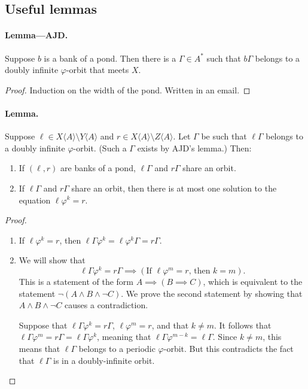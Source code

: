 \documentclass[12pt]{article}
\let\phi\varphi
\def\ofA{\langle A \rangle}
\begin{document}
\subsection{Useful lemmas}
\paragraph{Lemma---AJD.} Suppose $b$ is a bank of a pond. Then there is a $\Gamma \in A^*$ such that $b \Gamma$ belongs to a doubly infinite $\phi$-orbit that meets $X$. 
\begin{proof}Induction on the width of the pond. Written in an email.\end{proof}

\paragraph{Lemma.} Suppose $\ell \in X\ofA \setminus Y\ofA$ and $r \in X\ofA \setminus Z\ofA$. Let $\Gamma$ be such that $\ell\Gamma$ belongs to a doubly infinite $\phi$-orbit. (Such a $\Gamma$ exists by AJD's lemma.) Then:
\begin{enumerate}
	\item \label{it:bank_test_down}
		If $(\ell, r)$ are banks of a pond, $\ell\Gamma$ and $r\Gamma$ share an orbit.
	\item \label{it:bank_test_up} 
		If $\ell\Gamma$ and $r\Gamma$ share an orbit, then there is at most one solution to the equation $\ell\phi^k = r$.
\end{enumerate}
\begin{proof}

\begin{enumerate}
	\item If $\ell\phi^k = r$, then $\ell\Gamma\phi^k = \ell \phi^k \Gamma = r \Gamma$.
	\item We will show that
	\begin{equation*}
		\ell\Gamma\phi^k = r \Gamma \implies (\text{If $\ell\phi^m = r$, then $k = m$}).
	\end{equation*}
	This is a statement of the form $A \implies (B \implies C)$, which is equivalent to the statement $\neg(A \land B \land \neg C)$. We prove the second statement by showing that $A \land B \land \neg C$ causes a contradiction.

	Suppose that $\ell\Gamma\phi^k = r\Gamma$, $\ell\phi^m = r$, and that $k \neq m$. It follows that  $\ell\Gamma\phi^m = r\Gamma = \ell\Gamma\phi^k$, meaning that $\ell\Gamma\phi^{m-k} = \ell \Gamma$. Since $k \neq m$, this means that $\ell\Gamma$ belongs to a periodic $\phi$-orbit. But this contradicts the fact that $\ell\Gamma$ is in a doubly-infinite orbit.
\end{enumerate}
\end{proof}
\end{document}
